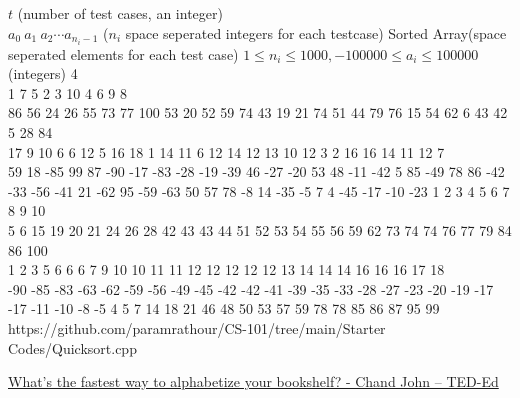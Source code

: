 \begin{testcases}
	{$t$ \hfill(number of test cases, an integer)\\
	$a_0\ a_1\ a_2 \cdots a_{n_i-1}$ \hfill($n_i$ space seperated integers for each testcase)}
	{Sorted Array\hfill(space seperated elements for each test case)}
	{$1\leq n_i \leq 1000, -100000\leq a_{i}\leq 100000$\hfill(integers)}
	{4\\
	1 7 5 2 3 10 4 6 9 8\\
	86 56 24 26 55 73 77 100 53 20 52 59 74 43 19 21 74 51 44 79 76 15 54 62 6 43 42 5 28 84\\
	17 9 10 6 6 12 5 16 18 1 14 11 6 12 14 12 13 10 12 3 2 16 16 14 11 12 7\\
	59 18 -85 99 87 -90 -17 -83 -28 -19 -39 46 -27 -20 53 48 -11 -42 5 85 -49 78 86 -42 -33 -56 -41 21 -62 95 -59 -63 50 57 78 -8 14 -35 -5 7 4 -45 -17 -10 -23}
	{1 2 3 4 5 6 7 8 9 10\\
	5 6 15 19 20 21 24 26 28 42 43 43 44 51 52 53 54 55 56 59 62 73 74 74 76 77 79 84 86 100\\
	1 2 3 5 6 6 6 7 9 10 10 11 11 12 12 12 12 12 13 14 14 14 16 16 16 17 18\\
	-90 -85 -83 -63 -62 -59 -56 -49 -45 -42 -42 -41 -39 -35 -33 -28 -27 -23 -20 -19 -17 -17 -11 -10 -8 -5 4 5 7 14 18 21 46 48 50 53 57 59 78 78 85 86 87 95 99}
	{https://github.com/paramrathour/CS-101/tree/main/Starter Codes/Quicksort.cpp}
\end{testcases}
\begin{funvideo}
	\href{https://youtu.be/WaNLJf8xzC4}{What's the fastest way to alphabetize your bookshelf? - Chand John -- TED-Ed}
\end{funvideo}
\recalctypearea